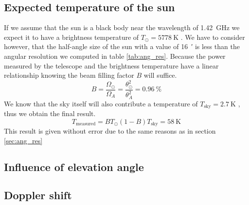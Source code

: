 \subsection{Expected temperature of the sun}\label{sec:temp}
If we assume that the sun is a black body near the wavelength of \SI{1.42}{\giga\hertz} we expect it to have a brightness temperature of $T_{\odot} = \SI{5778}{\kelvin}$ \cite[p. 211]{ftb}.
We have to consider however, that the half-angle size of the sun with a value of \SI{16}{\arcminute} \cite[p. 211]{ftb} is less than the angular resolution we computed in table \ref{tab:ang_res}.
Because the power measured by the telescope and the brightness temperature have a linear relationship knowing the beam filling factor $B$ will suffice.
\begin{equation}
    B = \frac{\Omega_{\odot}}{\Omega_A} = \frac{\theta_{\odot}^2}{\theta_A^2} = \SI{0.96
    }{\percent}
\end{equation}
We know that the sky itself will also contribute a temperature of $T_{\text{sky}} = \SI{2.7}{\kelvin}$ \cite[p. 4]{script}, thus we obtain the final result.
\begin{equation}
    T_{\text{measured}} = B T_{\odot} (1-B) T_{\text{sky}} = \SI{58}{\kelvin}
\end{equation}
This result is given without error due to the same reasons as in section \ref{sec:ang_res}


\subsection{Influence of elevation angle}


\subsection{Doppler shift}